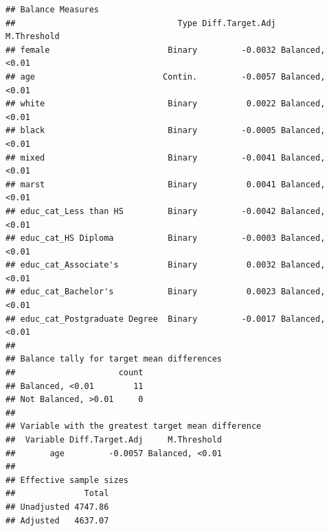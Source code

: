 \documentclass[
]{article}
\newenvironment{Shaded}{\begin{snugshade}}{\end{snugshade}}
\newcommand{\AttributeTok}[1]{\textcolor[rgb]{0.13,0.29,0.53}{#1}}
\newcommand{\CommentTok}[1]{\textcolor[rgb]{0.56,0.35,0.01}{\textit{#1}}}
\newcommand{\DecValTok}[1]{\textcolor[rgb]{0.00,0.00,0.81}{#1}}
\newcommand{\FunctionTok}[1]{\textcolor[rgb]{0.13,0.29,0.53}{\textbf{#1}}}
\newcommand{\NormalTok}[1]{#1}
\newcommand{\OtherTok}[1]{\textcolor[rgb]{0.56,0.35,0.01}{#1}}
\newcommand{\SpecialCharTok}[1]{\textcolor[rgb]{0.81,0.36,0.00}{\textbf{#1}}}
\newcommand{\StringTok}[1]{\textcolor[rgb]{0.31,0.60,0.02}{#1}}
\begin{document}
\begin{Shaded}
\end{Shaded}

\begin{verbatim}
## Balance Measures
##                                 Type Diff.Target.Adj     M.Threshold
## female                        Binary         -0.0032 Balanced, <0.01
## age                          Contin.         -0.0057 Balanced, <0.01
## white                         Binary          0.0022 Balanced, <0.01
## black                         Binary         -0.0005 Balanced, <0.01
## mixed                         Binary         -0.0041 Balanced, <0.01
## marst                         Binary          0.0041 Balanced, <0.01
## educ_cat_Less than HS         Binary         -0.0042 Balanced, <0.01
## educ_cat_HS Diploma           Binary         -0.0003 Balanced, <0.01
## educ_cat_Associate's          Binary          0.0032 Balanced, <0.01
## educ_cat_Bachelor's           Binary          0.0023 Balanced, <0.01
## educ_cat_Postgraduate Degree  Binary         -0.0017 Balanced, <0.01
## 
## Balance tally for target mean differences
##                     count
## Balanced, <0.01        11
## Not Balanced, >0.01     0
## 
## Variable with the greatest target mean difference
##  Variable Diff.Target.Adj     M.Threshold
##       age         -0.0057 Balanced, <0.01
## 
## Effective sample sizes
##              Total
## Unadjusted 4747.86
## Adjusted   4637.07
\end{verbatim}
\end{document}
